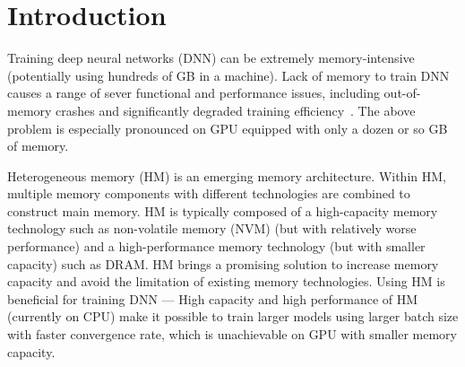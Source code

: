 \section{Introduction}

Training deep neural networks (DNN) can be extremely memory-intensive (potentially using hundreds of GB in a machine). Lack of memory to train DNN causes a range of sever functional and performance issues, including out-of-memory crashes and  significantly degraded training efficiency~\cite{Wang:2018:SDG:3178487.3178491,Rhu:2016:VVD:3195638.3195660}. The above problem is especially pronounced on GPU equipped with only a dozen or so GB of memory.



Heterogeneous memory (HM) is an emerging memory architecture.  %
Within HM, multiple memory components with different technologies are combined to construct  main memory. HM is typically composed of a high-capacity memory technology such as non-volatile memory (NVM) (but with relatively worse performance) and a high-performance memory technology (but with smaller capacity) such as DRAM. HM brings a promising solution to increase memory capacity and avoid the limitation of existing memory technologies. %
Using HM is beneficial for training DNN --- 
High capacity and high performance of HM (currently on CPU) make it possible to train larger models using larger batch size with faster convergence rate, which is unachievable on GPU with smaller memory capacity.%




